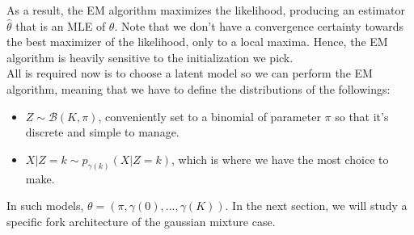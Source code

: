 As a result, the EM algorithm maximizes the likelihood, producing an estimator $\widehat{\theta}$ that is an MLE of $\theta$.
Note that we don't have a convergence certainty towards the best maximizer of the likelihood, only to a local maxima.
Hence, the EM algorithm is heavily sensitive to the initialization we pick. \\

All is required now is to choose a latent model so we can perform the EM algorithm, meaning that we have to define the distributions of the followings:
\begin{itemize}
    \item $Z \sim \mathcal{B}(K, \pi)$, conveniently set to a binomial of parameter $\pi$ so that it's discrete and simple to manage.
    \item $X|Z=k \sim p_{\gamma(k)}(X|Z=k)$, which is where we have the most choice to make.
\end{itemize}

In such models, $\theta = (\pi, \gamma(0), ..., \gamma(K))$.
In the next section, we will study a specific fork architecture of the gaussian mixture case.
